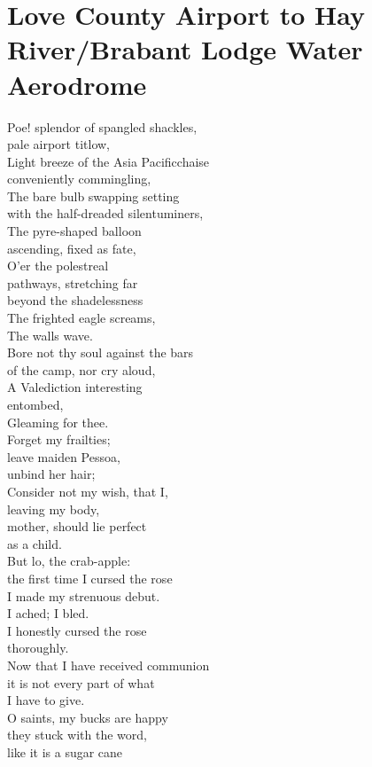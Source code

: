 \documentclass[smalldemyvopaper,11pt,twoside,onecolumn,openright,extrafontsizes]{memoir}
\begin{document}
\chapter{Love County Airport to Hay River/Brabant Lodge Water Aerodrome}
Poe! splendor of spangled shackles,
\\pale airport titlow,
\\Light breeze of the Asia Pacificchaise
\\conveniently commingling,
\\The bare bulb swapping setting
\\with the half-dreaded silentuminers,
\\The pyre-shaped balloon
\\ascending, fixed as fate,
\\O'er the polestreal
\\pathways, stretching far
\\beyond the shadelessness
\\The frighted eagle screams,
\\The walls wave.
\\Bore not thy soul against the bars
\\of the camp, nor cry aloud,
\\A Valediction interesting
\\entombed,
\\Gleaming for thee.
\\Forget my frailties;
\\leave maiden Pessoa,
\\unbind her hair;
\\Consider not my wish, that I,
\\leaving my body,
\\mother, should lie perfect
\\as a child.
\\But lo, the crab-apple:
\\the first time I cursed the rose
\\I made my strenuous debut.
\\I ached; I bled.
\\I honestly cursed the rose
\\thoroughly.
\\Now that I have received communion
\\it is not every part of what
\\I have to give.
\\O saints, my bucks are happy
\\they stuck with the word,
\\like it is a sugar cane
\end{document}
